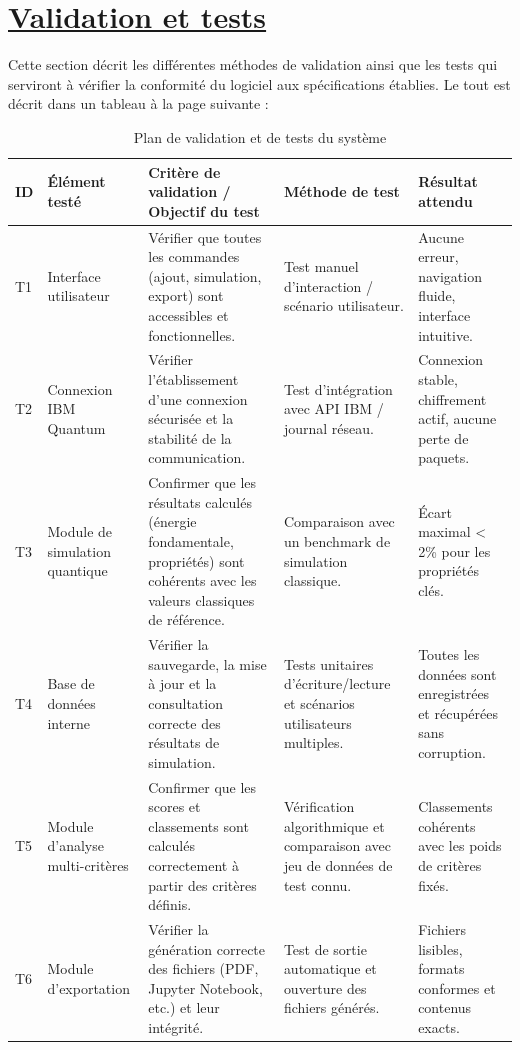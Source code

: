\documentclass[11pt]{article}
\begin{document}
\section{\underline{Validation et tests}}
Cette section décrit les différentes méthodes de validation ainsi que les tests qui serviront à vérifier la conformité du logiciel aux spécifications établies. Le tout est décrit dans un tableau à la page suivante :

\begin{table}[h!]
\centering
\caption{Plan de validation et de tests du système}
\begin{tabular}{|p{1cm}|p{4cm}|p{5cm}|p{3cm}|p{3cm}|}
\hline
\textbf{ID} & \textbf{Élément testé} & \textbf{Critère de validation / Objectif du test} & \textbf{Méthode de test} & \textbf{Résultat attendu} \\
\hline
T1 & Interface utilisateur & Vérifier que toutes les commandes (ajout, simulation, export) sont accessibles et fonctionnelles. & Test manuel d’interaction / scénario utilisateur. & Aucune erreur, navigation fluide, interface intuitive. \\
\hline
T2 & Connexion IBM Quantum & Vérifier l’établissement d’une connexion sécurisée et la stabilité de la communication. & Test d’intégration avec API IBM / journal réseau. & Connexion stable, chiffrement actif, aucune perte de paquets. \\
\hline
T3 & Module de simulation quantique & Confirmer que les résultats calculés (énergie fondamentale, propriétés) sont cohérents avec les valeurs classiques de référence. & Comparaison avec un benchmark de simulation classique. & Écart maximal < 2\% pour les propriétés clés. \\
\hline
T4 & Base de données interne & Vérifier la sauvegarde, la mise à jour et la consultation correcte des résultats de simulation. & Tests unitaires d’écriture/lecture et scénarios utilisateurs multiples. & Toutes les données sont enregistrées et récupérées sans corruption. \\
\hline
T5 & Module d’analyse multi-critères & Confirmer que les scores et classements sont calculés correctement à partir des critères définis. & Vérification algorithmique et comparaison avec jeu de données de test connu. & Classements cohérents avec les poids de critères fixés. \\
\hline
T6 & Module d’exportation & Vérifier la génération correcte des fichiers (PDF, Jupyter Notebook, etc.) et leur intégrité. & Test de sortie automatique et ouverture des fichiers générés. & Fichiers lisibles, formats conformes et contenus exacts. \\

\end{tabular}
\end{table}
\end{document}
